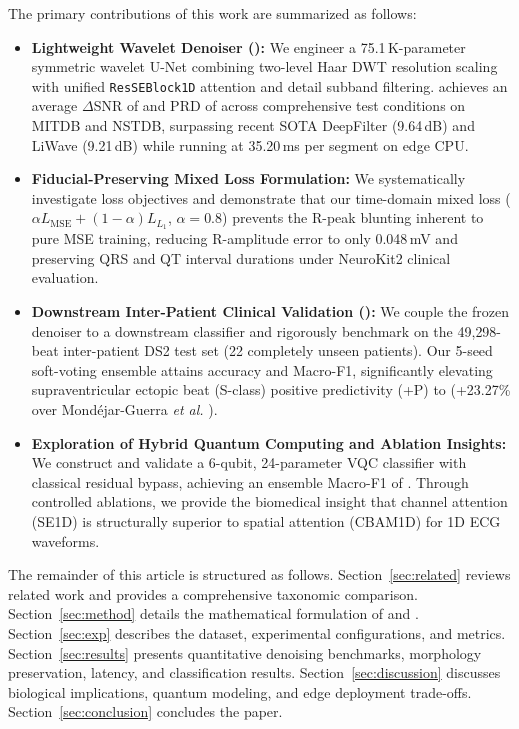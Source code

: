 The primary contributions of this work are summarized as follows:
\begin{itemize}
    \item \textbf{Lightweight Wavelet Denoiser (\HSL):} We engineer a 75.1\,K-parameter symmetric wavelet U-Net combining two-level Haar DWT resolution scaling with unified \texttt{ResSEBlock1D} attention and detail subband filtering. \HSL{} achieves an average $\Delta$SNR of  and PRD of  across comprehensive test conditions on MITDB and NSTDB, surpassing recent SOTA DeepFilter \cite{romero2021} (9.64\,dB) and LiWave \cite{nguyen2026liwave} (9.21\,dB) while running at 35.20\,ms per segment on edge CPU.
    \item \textbf{Fiducial-Preserving Mixed Loss Formulation:} We systematically investigate loss objectives and demonstrate that our time-domain mixed loss ($\alpha L_{\mathrm{MSE}} + (1-\alpha)L_{L_1}$, $\alpha=0.8$) prevents the R-peak blunting inherent to pure MSE training, reducing R-amplitude error to only 0.048\,mV and preserving QRS and QT interval durations under NeuroKit2 clinical evaluation.
    \item \textbf{Downstream Inter-Patient Clinical Validation (\RRN):} We couple the frozen denoiser to a downstream classifier and rigorously benchmark on the 49{,}298-beat inter-patient DS2 test set (22 completely unseen patients). Our 5-seed soft-voting ensemble attains  accuracy and  Macro-F1, significantly elevating supraventricular ectopic beat (S-class) positive predictivity (+P) to  (+23.27\% over Mond{\'e}jar-Guerra \emph{et al.} \cite{mondejar2019}).
    \item \textbf{Exploration of Hybrid Quantum Computing and Ablation Insights:} We construct and validate a 6-qubit, 24-parameter VQC classifier with classical residual bypass, achieving an ensemble Macro-F1 of . Through controlled ablations, we provide the biomedical insight that channel attention (SE1D) is structurally superior to spatial attention (CBAM1D) for 1D ECG waveforms.
\end{itemize}

The remainder of this article is structured as follows. Section~\ref{sec:related} reviews related work and provides a comprehensive taxonomic comparison. Section~\ref{sec:method} details the mathematical formulation of \HSL{} and \RRN. Section~\ref{sec:exp} describes the dataset, experimental configurations, and metrics. Section~\ref{sec:results} presents quantitative denoising benchmarks, morphology preservation, latency, and classification results. Section~\ref{sec:discussion} discusses biological implications, quantum modeling, and edge deployment trade-offs. Section~\ref{sec:conclusion} concludes the paper.
